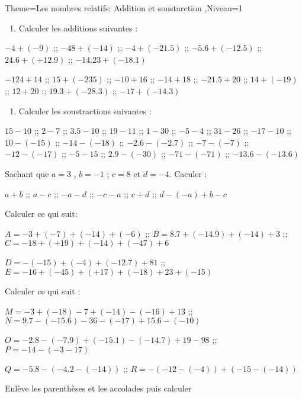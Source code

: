 \documentclass[a4paper,12pt]{article}
\begin{document}
\begin{Maquette}[Fiche]{Theme=Les nombres relatifs: Addition et soustarction ,Niveau=1}

\begin{exercice}
\begin{enumerate}
\item Calculer les additions suivantes :
\end{enumerate}
$-4+(-9)$ ;; $-48+(-14)$ ;; $-4+(-21.5)$ ;; $-5.6+(-12.5)$ ;; $24.6+(+12.9)$ ;; $-14.23+(-18.1)$

$-124+14$ ;; $15+(-235)$ ;; $-10+16$ ;; $-14+18$ ;; $-21.5+20$ ;; $14+(-19)$ ;; $12+20$ ;; $19.3+(-28.3)$ ;; $-17+(-14.3)$
\end{exercice}

\begin{exercice}
\begin{enumerate}
\item Calculer les soustractions suivantes :
\end{enumerate}
$15-10$ ;; $2-7$ ;; $3.5-10$ ;; $19-11$ ;; $1-30$ ;; $-5-4$ ;;
$31-26$ ;; $-17-10$ ;; $10-(-15)$ ;; $-14-(-18)$ ;; $-2.6-(-2.7)$ ;; 
$-7-(-7)$ ;; $-12-(-17)$ ;; $-5-15$ ;; $2.9-(-30)$ ;; $-71-(-71)$ ;; 
$-13.6-(-13.6)$
\end{exercice}

\begin{exercice}
Sachant que $a=3$ , $b=-1$ ; $c=8$ et $d=-4$. Caculer :

$a+b$ ;; $a-c$ ;; $-a-d$ ;; $-c-a$ ;; $c+d$ ;; $d-(-a)+b-c$
\end{exercice}

\begin{exercice}
Calculer ce qui suit:

$A=-3+(-7)+(-14)+(-6)$ ;; $B=8.7+(-14.9)+(-14)+3 $ ;; $C=-18+(+19)+(-14)+(-47)+6$

$D=-(-15)+(-4)+(-12.7)+81$ ;; $E=-16+(-45)+(+17)+(-18)+23+(-15)$
\end{exercice}

\begin{exercice}
Calculer ce qui suit :

$M=-3+(-18)-7+(-14)-(-16)+13$ ;; $N=9.7-(-15.6)-36-(-17)+15.6-(-10)$

$O=-2.8-(-7.9)+(-15.1)-(-14.7)+19-98$ ;; $P=-14-(-3-17)$

$Q=-5.8-(-4.2-(-14))$ ;;  $R=-(-12-(-4))+(-15-(-14))$
\end{exercice}

\begin{exercice}
Enlève les parenthèses et les accolades puis calculer 


\end{exercice}
\end{Maquette}
\end{document}
